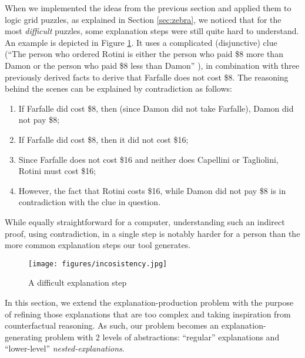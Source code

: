 When we implemented the ideas from the previous section and applied them to logic grid puzzles, as explained in Section \ref{sec:zebra}, we noticed that 
for the most \textit{difficult} puzzles, some explanation steps were still quite hard to understand.
An example is depicted in Figure \ref{fig:pasta_diff}.
It uses a complicated (disjunctive) clue (``The person who ordered Rotini is either the person who paid \$8 more than Damon or the person who paid \$8 less than Damon'' ), in combination with three previously derived facts to derive that Farfalle does not cost \$8.
The reasoning behind the scenes can be explained by contradiction as follows: 
 \begin{enumerate}
  \item If Farfalle did cost \$8, then (since Damon did not take Farfalle), Damon did not pay \$8;
  \item If Farfalle did cost \$8, then it did not cost \$16; 
  \item Since Farfalle does not cost \$16 and neither does Capellini or Tagliolini, Rotini must cost \$16;
  \item However, the fact that Rotini costs \$16, while Damon did not pay \$8 is in contradiction with the clue in question. 
 \end{enumerate}
 While equally straightforward for a computer, understanding such an indirect proof, using contradiction, in a single step is notably harder for a person than the more common explanation steps our tool generates.
\begin{figure}[t!]
    \texttt{[image: figures/incosistency.jpg]}
    \caption{A difficult explanation step}\label{fig:pasta_diff}
\end{figure}

In this section, we extend the explanation-production problem with the purpose of refining those explanations that are too complex and taking inspiration from counterfactual reasoning.
As such, our problem becomes an explanation-generating problem with 2 levels of abstractions: ``regular'' explanations and ``lower-level'' \textit{nested-explanations}.

